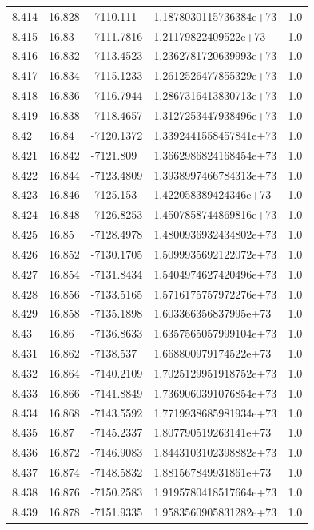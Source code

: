 \begin{tabular}{lllll}
8.414 & 16.828 & -7110.111 & 1.1878030115736384e+73 & 1.0 \\
8.415 & 16.83 & -7111.7816 & 1.21179822409522e+73 & 1.0 \\
8.416 & 16.832 & -7113.4523 & 1.2362781720639993e+73 & 1.0 \\
8.417 & 16.834 & -7115.1233 & 1.2612526477855329e+73 & 1.0 \\
8.418 & 16.836 & -7116.7944 & 1.2867316413830713e+73 & 1.0 \\
8.419 & 16.838 & -7118.4657 & 1.3127253447938496e+73 & 1.0 \\
8.42 & 16.84 & -7120.1372 & 1.3392441558457841e+73 & 1.0 \\
8.421 & 16.842 & -7121.809 & 1.3662986824168454e+73 & 1.0 \\
8.422 & 16.844 & -7123.4809 & 1.3938997466784313e+73 & 1.0 \\
8.423 & 16.846 & -7125.153 & 1.422058389424346e+73 & 1.0 \\
8.424 & 16.848 & -7126.8253 & 1.4507858744869816e+73 & 1.0 \\
8.425 & 16.85 & -7128.4978 & 1.4800936932434802e+73 & 1.0 \\
8.426 & 16.852 & -7130.1705 & 1.5099935692122072e+73 & 1.0 \\
8.427 & 16.854 & -7131.8434 & 1.5404974627420496e+73 & 1.0 \\
8.428 & 16.856 & -7133.5165 & 1.5716175757972276e+73 & 1.0 \\
8.429 & 16.858 & -7135.1898 & 1.603366356837995e+73 & 1.0 \\
8.43 & 16.86 & -7136.8633 & 1.6357565057999104e+73 & 1.0 \\
8.431 & 16.862 & -7138.537 & 1.668800979174522e+73 & 1.0 \\
8.432 & 16.864 & -7140.2109 & 1.7025129951918752e+73 & 1.0 \\
8.433 & 16.866 & -7141.8849 & 1.7369060391076854e+73 & 1.0 \\
8.434 & 16.868 & -7143.5592 & 1.7719938685981934e+73 & 1.0 \\
8.435 & 16.87 & -7145.2337 & 1.807790519263141e+73 & 1.0 \\
8.436 & 16.872 & -7146.9083 & 1.8443103102398882e+73 & 1.0 \\
8.437 & 16.874 & -7148.5832 & 1.881567849931861e+73 & 1.0 \\
8.438 & 16.876 & -7150.2583 & 1.9195780418517664e+73 & 1.0 \\
8.439 & 16.878 & -7151.9335 & 1.9583560905831282e+73 & 1.0 \\

\end{tabular}
